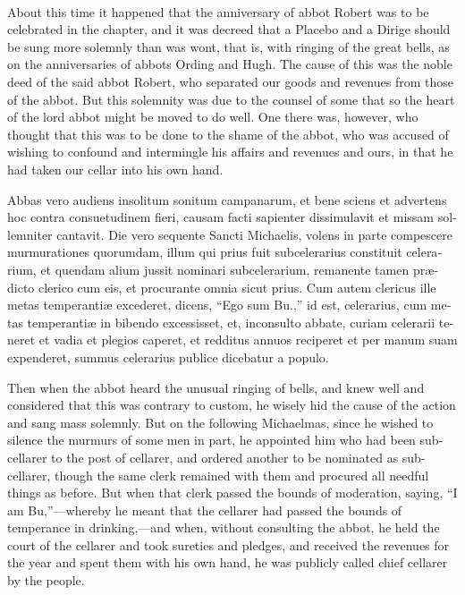 \documentclass[10pt]{book}
\newcounter{engnote}
\newcommand{\engnotenum}{\textsuperscript{\arabic{engnote}\stepcounter{engnote}}}
\begin{document}
\begin{paracol}{2}
\switchcolumn

About this time it happened that the anniversary of abbot Robert\engnotenum{} was to be celebrated in the chapter, and it was decreed that a Placebo and a Dirige should be sung more solemnly than was wont, that is, with ringing of the great bells, as on the anniversaries of abbots Ording and Hugh. The cause of this was the noble deed of the said abbot Robert, who separated our goods and revenues from those of the abbot. But this solemnity was due to the counsel of some that so the heart of the lord abbot might be moved to do well. One there was, however, who thought that this was to be done to the shame of the abbot, who was accused of wishing to confound and intermingle his affairs and revenues and ours, in that he had taken our cellar into his own hand.

\switchcolumn*

\begin{otherlanguage}{latin}
Abbas vero audiens insolitum sonitum campanarum, et bene sciens et advertens hoc contra consuetudinem fieri, causam facti sapienter dissimulavit et missam sollemniter cantavit. Die vero sequente Sancti Michaelis, volens in parte compescere murmurationes quorumdam, illum qui prius fuit subcelerarius constituit celerarium, et quendam alium jussit nominari subcelerarium, remanente tamen pr\ae{}dicto clerico cum eis, et procurante omnia sicut prius. Cum autem clericus ille metas temperanti\ae{} excederet, dicens, ``Ego sum Bu.,'' id est, celerarius, cum metas temperanti\ae{} in bibendo excessisset, et, inconsulto abbate, curiam celerarii teneret et vadia et plegios caperet, et redditus annuos reciperet et per manum suam expenderet, summus celerarius publice dicebatur a populo. 
\end{otherlanguage}

\switchcolumn

Then when the abbot heard the unusual ringing of bells, and knew well and considered that this was contrary to custom, he wisely hid the cause of the action and sang mass solemnly. But on the following Michaelmas, since he wished to silence the murmurs of some men in part, he appointed him who had been sub-cellarer to the post of cellarer, and ordered another to be nominated as sub-cellarer, though the same clerk remained with them and procured all needful things as before. But when that clerk passed the bounds of moderation, saying, ``I am Bu,''---whereby he meant that the cellarer had passed the bounds of temperance in drinking,---and when, without consulting the abbot, he held the court of the cellarer and took sureties and pledges, and received the revenues for the year and spent them with his own hand, he was publicly called chief cellarer by the people.


\end{paracol}
\end{document}
